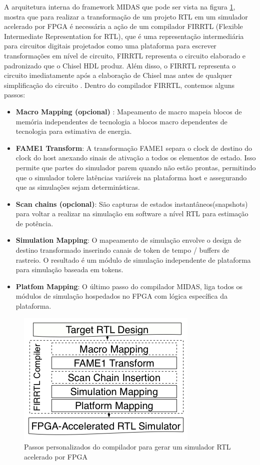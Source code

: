 \documentclass[conference]{IEEEtran}
\begin{document}
	A arquitetura interna do framework MIDAS que pode ser vista na figura \ref{Midas Arch}, mostra que para realizar a transformação de um projeto RTL em um simulador acelerado por FPGA é necessária a ação de um compilador FIRRTL (Flexible Intermediate Representation for RTL), que é uma representação intermediária para circuitos digitais projetados como uma plataforma para escrever transformações em nível de circuito, FIRRTL representa o circuito elaborado e padronizado que o Chisel HDL produz. Além disso, o FIRRTL representa o circuito imediatamente após a elaboração de Chisel mas antes de qualquer simplificação do circuito \cite{b10}. Dentro do compilador FIRRTL, contemos alguns passos:
	\begin{itemize}
		\item \textbf{Macro Mapping (opcional)} : Mapeamento de macro mapeia blocos de memória independentes de tecnologia
		a blocos macro dependentes de tecnologia para estimativa de energia.
		\item \textbf{FAME1 Transform}: A transformação FAME1 separa o clock de destino do clock do host anexando sinais de ativação a todos os elementos de estado. Isso permite que partes do simulador parem quando não estão prontas, permitindo que o simulador tolere latências variáveis na plataforma host e assegurando que as simulações sejam determinísticas.
		\item \textbf{Scan chains (opcional)}: São capturas de estados instantâneos(snapshots) para voltar a realizar na simulação em software a nível RTL para estimação de potência.  
		\item \textbf{Simulation Mapping}: O mapeamento de simulação envolve o design de destino transformado inserindo canais de token de tempo / buffers de rastreio. O resultado é um módulo de simulação independente de plataforma para simulação baseada em tokens.
		\item \textbf{Platfom Mapping}: O último passo do compilador MIDAS, liga todos os módulos de simulação hospedados no FPGA com lógica específica da plataforma.
	\end{itemize}
	
	\begin{figure}[htbp]
		\centerline{\includegraphics[scale=1.4]{fig4.png}}
		\caption{Passos personalizados do compilador para gerar um simulador RTL acelerado por FPGA
		}
		
		\label{Midas Arch}
	\end{figure}
	
\end{document}
